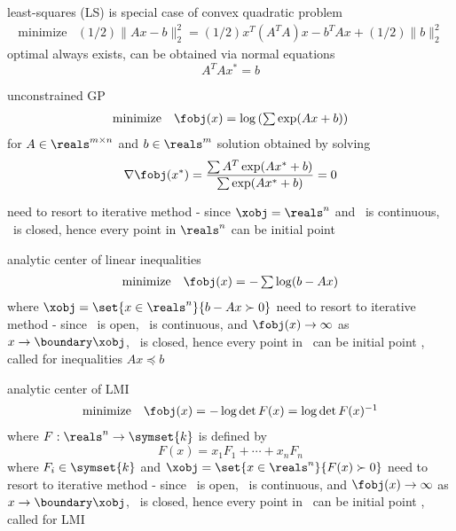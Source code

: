 \documentclass[17pt,landscape]{foils}
\begin{document}
{	\vitem

	\vitem
		least-squares (LS) is special case of convex quadratic problem
		$$
			\begin{array}{ll}
				\mbox{minimize} &
					(1/2) \|Ax-b\|_2^2
					= (1/2) x^T (A^TA) x - b^TAx + (1/2)\|b\|_2^2
			\end{array}
		$$
		\bit
		\viitem
			optimal always exists, can be obtained via normal equations
			$$
				A^T Ax^\ast = b
			$$
		\eit
	\eit

\vitem
	unconstrained GP
	$$
		\begin{array}{ll}
			\mbox{minimize} &
				\fobj(x) =
				\log\left(
					\sum \exp (Ax+b)
				\right)
		\end{array}
	$$
	for $A\in\reals^{m\times n}$ and $b\in\reals^m$
	\bit
	\vitem
		solution obtained by solving
		$$
			\nabla \fobj(x^\ast) = \frac{\sum A^T \exp(Ax^\ast+b)}{\sum \exp(Ax^\ast+b)} = 0
	 	$$

	\vitem
		need to resort to iterative method -
		since $\xobj = \reals^n$ and \fobj\ is continuous,
		\fobj\ is closed,
		hence
		every point in $\reals^n$ can be initial point
	\eit

\vitem
	analytic center of linear inequalities
	$$
		\begin{array}{ll}
			\mbox{minimize} &
				\fobj(x) = - \sum\log(b-Ax)
		\end{array}
	$$
	where $\xobj = \set{x\in\reals^n}{b-Ax \succ 0}$
	\bit
	\vitem
		need to resort to iterative method -
		since \xobj\ is open, \fobj\ is continuous,
		and $\fobj(x) \to \infty$ as $x\to\boundary \xobj$,
		\fobj\ is closed,
		hence
		every point in \xobj\ can be initial point
	\vitem
		\fobj, called  for inequalities $Ax\preceq b$
	\eit

\vitem
	analytic center of LMI
	$$
		\begin{array}{ll}
			\mbox{minimize} &
				\fobj(x) = - \log\det F(x) = \log\det F(x)^{-1}
		\end{array}
	$$
	where $F:\reals^n\to \symset{k}$ is defined by
	$$
		F(x) = x_1F_1 + \cdots + x_nF_n
	$$
	where $F_i\in \symset{k}$
	and $\xobj = \set{x\in\reals^n}{F(x)\succ 0}$
	\bit
	\vitem
		need to resort to iterative method -
		since \xobj\ is open, \fobj\ is continuous,
		and $\fobj(x) \to \infty$ as $x\to\boundary \xobj$,
		\fobj\ is closed,
		hence
		every point in \xobj\ can be initial point
	\vitem
		\fobj, called  for LMI
	\eit
\eit
\vfill


}
\end{document}
